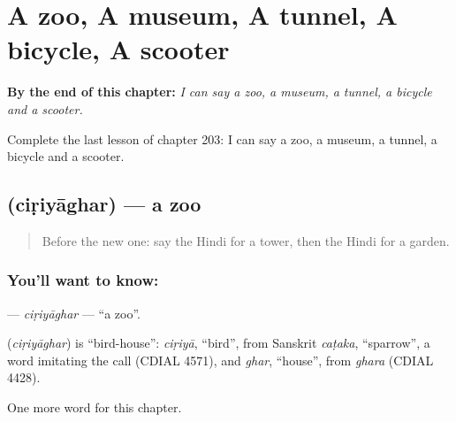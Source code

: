 
\chapter{A zoo, A museum, A tunnel, A bicycle, A scooter}
\label{ch:hi-a-zoo-a-museum-a-tunnel-a-bicycle-a-scooter}

\begin{chapteropening}
\textbf{By the end of this chapter:} \emph{I can say a zoo, a museum, a tunnel, a bicycle and a scooter.}

Complete the last lesson of chapter 203: I can say a zoo, a museum, a tunnel, a bicycle and a scooter.
\end{chapteropening}

\section[\texorpdfstring{\hi{चिड़ियाघर} (ciṛiyāghar)}{चिड़ियाघर (ciṛiyāghar)}]{ (ciṛiyāghar) — a zoo}

\label{lesson:HI-C203-ciriyaghar}



\begin{quote}
Before the new one: say the Hindi for a tower, then the Hindi for a garden.
\end{quote}

\subsection*{You'll want to know: }
\textbf{} — \emph{ciṛiyāghar} — \textquotedblleft{}a zoo\textquotedblright{}.

\begin{cousinweb}
\textbf{} (\emph{ciṛiyāghar}) is \textquotedblleft{}bird-house\textquotedblright{}: \emph{ciṛiyā}, \textquotedblleft{}bird\textquotedblright{}, from Sanskrit \emph{caṭaka}, \textquotedblleft{}sparrow\textquotedblright{}, a word imitating the call (CDIAL 4571), and \emph{ghar}, \textquotedblleft{}house\textquotedblright{}, from \emph{ghara} (CDIAL 4428).
\end{cousinweb}

\begin{grammarlens}[title={What you've built}]
One more word for this chapter.
\end{grammarlens}

